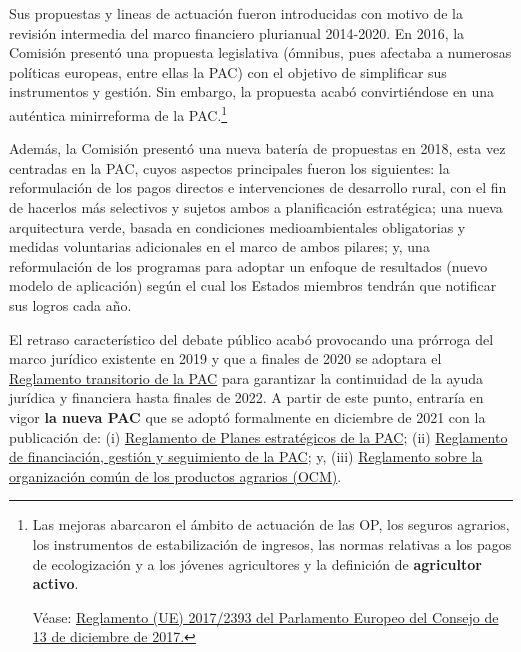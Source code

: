 \documentclass[10pt,a4paper]{article}
\begin{document}
Sus propuestas y lineas de actuación fueron introducidas con motivo de la revisión intermedia del marco financiero plurianual 2014-2020. En 2016, la Comisión presentó una propuesta legislativa (ómnibus, pues afectaba a numerosas políticas europeas, entre ellas la PAC) con el objetivo de simplificar sus instrumentos y gestión. Sin embargo, la propuesta acabó convirtiéndose en una auténtica minirreforma de la PAC.\footnote{%
    Las mejoras abarcaron el ámbito de actuación de las OP, los seguros agrarios, los instrumentos de estabilización de ingresos, las normas relativas a los pagos de ecologización y a los jóvenes agricultores y la definición de \textbf{agricultor activo}. 

Véase: \href{https://www.boe.es/doue/2017/350/L00015-00049.pdf}{Reglamento (UE) 2017/2393 del Parlamento Europeo del Consejo de 13 de diciembre de 2017.}
} 

Además, la Comisión presentó una nueva batería de propuestas en 2018, esta vez centradas en la PAC, cuyos aspectos principales fueron los siguientes: la reformulación de los pagos directos e intervenciones de desarrollo rural, con el fin de hacerlos más selectivos y sujetos ambos a planificación estratégica; una nueva arquitectura verde, basada en condiciones medioambientales obligatorias y medidas voluntarias adicionales en el marco de ambos pilares; y, una reformulación de los programas para adoptar un enfoque de resultados (nuevo modelo de aplicación) según el cual los Estados miembros tendrán que notificar sus logros cada año.

El retraso característico del debate público acabó provocando una prórroga del marco jurídico existente en 2019 y que a finales de 2020 se adoptara el \href{https://www.boe.es/buscar/doc.php?id=DOUE-L-2020-81956}{Reglamento transitorio de la PAC} para garantizar la continuidad de la ayuda jurídica y financiera hasta finales de 2022. A partir de este punto, entraría en vigor \textbf{la nueva PAC} que se adoptó formalmente en diciembre de 2021 con la publicación de: (i) \href{https://www.boe.es/buscar/doc.php?id=DOUE-L-2021-81699}{Reglamento de Planes estratégicos de la PAC}; (ii) \href{https://www.boe.es/buscar/doc.php?id=DOUE-L-2021-81700}{Reglamento de financiación, gestión y seguimiento de la PAC}; y, (iii) \href{https://www.boe.es/buscar/doc.php?id=DOUE-L-2021-81701}{Reglamento sobre la organización común de los productos agrarios (OCM)}.
\end{document}
